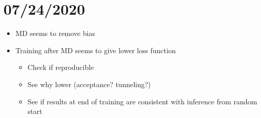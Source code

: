 \section{07/24/2020}
\begin{itemize}
  \item MD seems to remove bias
  \item Training after MD seems to give lower loss function
    \begin{itemize}
      \item Check if reproducible
      \item See why lower (acceptance? tunneling?)
      \item See if results at end of training are consistent with inference
        from random start
    \end{itemize}
\end{itemize}



